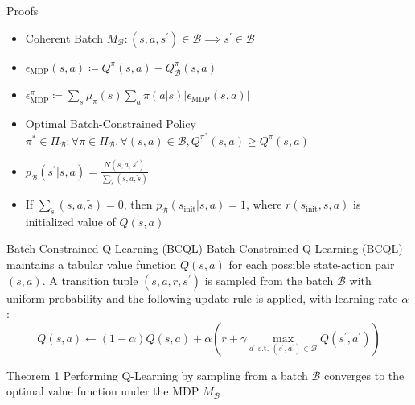 \documentclass[11pt]{beamer}
\newcommand{\mc}[1]{\mathcal{#1}}
\newcommand{\abs}[1]{\left\lvert #1 \right\rvert}
\begin{document}
\begin{frame}{Proofs}
    \begin{itemize}
        \item Coherent Batch $M_{\mc{B}} : (s,a,s^\prime) \in \mc{B} \implies s^\prime \in \mc{B}$ 
        \item $\epsilon_{\text{MDP}}(s,a) \coloneqq Q^\pi (s,a) - Q^\pi_{\mc{B}}(s,a)$
        \item $\epsilon^\pi_{\text{MDP}} \coloneqq \sum_s \mu_\pi (s) \sum_a \pi(a|s) \abs{\epsilon_{\text{MDP}}(s,a)}$
        \item Optimal Batch-Constrained Policy $\pi^\ast \in \Pi_{\mc{B}} : \forall \pi \in \Pi_{\mc{B}}, \forall (s,a) \in \mc{B}, Q^{\pi^\ast}(s,a) \geq Q^\pi (s,a)$
        \item $p_{\mc{B}}(s^\prime|s,a) = \frac{N(s,a,s^\prime)}{\sum_{\tilde{s}}(s,a,\tilde{s})}$
        \item If $\sum_{\tilde{s}}(s,a,\tilde{s}) = 0$, then $p_{\mc{B}}(s_{\text{init}}|s,a)=1$, where $r(s_{\text{init}}, s, a)$ is initialized value of $Q(s,a)$
    \end{itemize}

    \begin{block}{Batch-Constrained Q-Learning (BCQL)}
        Batch-Constrained Q-Learning (BCQL) maintains a tabular value function $Q(s,a)$ for each possible state-action pair $(s,a)$.
        A transition tuple $(s,a,r,s^\prime)$ is sampled from the batch $\mc{B}$ with uniform probability and the following update rule  is applied, with learning rate $\alpha$:
        \[
            Q(s,a) \leftarrow (1- \alpha) Q(s,a) + \alpha (r + \gamma \max_{a^\prime \text{ s.t. } (s^\prime, a^\prime) \in \mc{B}} Q(s^\prime, a^\prime))
        \]
    \end{block}

    \begin{block}{Theorem 1} \label{th:1}
        Performing Q-Learning by sampling from a batch $\mc{B}$ converges to the optimal value function under the MDP $M_{\mc{B}}$
    \end{block}
\end{frame}
\end{document}
